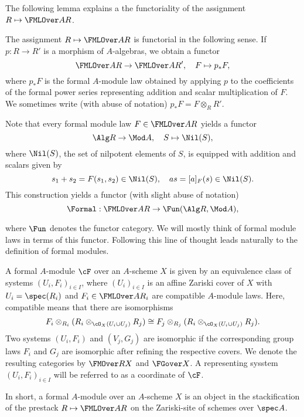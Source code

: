 \documentclass[../main.tex]{subfiles}
\begin{document}
The following lemma explains a the functoriality of the assignment
$R \mapsto \FMLOver A R$.

\begin{lem}\label{lem:FMLFunc}
  The assignment $R \mapsto \FMLOver A R$ is functorial in the following sense.
  If $p: R \to R'$ is a morphism of $A$-algebras, we obtain a functor
  \begin{equation*}
    \FMLOver A R \to \FMLOver A {R'}, \quad F \mapsto p_*F,
  \end{equation*}
  where $p_*F$ is the formal $A$-module law obtained by applying $p$ to the
  coefficients of the formal power series representing addition
  and scalar multiplication of $F$. We sometimes write
  (with abuse of notation) $p_* F = F \otimes_R R'$. 
\end{lem}

Note that every formal module law $F \in \FMLOver A R$ yields a functor
\begin{equation*}
  \Alg R \to \Mod A, \quad S \mapsto \Nil(S),
\end{equation*}
where $\Nil(S)$, the set of nilpotent elements of $S$, is equipped with
addition and scalars given by 
\begin{equation*}
  s_1 + s_2 = F(s_1, s_2) \in \Nil(S), \quad a s = [a]_F(s) \in \Nil(S).
\end{equation*}
This construction yields a functor (with slight abuse of notation)
\begin{equation*}
  \Formal: \FMLOver A R \to \Fun(\Alg R, \Mod A),
\end{equation*}

where $\Fun$ denotes the functor category. We will mostly think of formal 
module laws in terms of this functor. Following this line of thought leads 
naturally to the definition of formal modules. 

\begin{defi}
  A formal $A$-module $\cF$ over an $A$-scheme $X$ is given by an equivalence class
  of systems $(U_i, F_i)_{i \in I}$, where $(U_i)_{i \in I}$ is an affine
  Zariski cover of $X$ with $U_i = \spec(R_i)$ and $F_i \in \FMLOver A {R_i}$
  are compatible $A$-module laws. Here, compatible means that there are
  isomorphisms
  \begin{equation*}
    F_i \otimes_{R_i} (R_i \otimes_{\cO_X(U_i \cup U_j)} R_j)  \cong F_j
    \otimes_{R_j} (R_i \otimes_{\cO_X(U_i \cup U_j)} R_j).
  \end{equation*}
  Two systems $(U_i, F_i)$ and 
  $(V_j, G_j)$ are isomorphic if the corresponding group laws
  $F_i$ and $G_j$ are isomorphic after refining the respective covers. 
  We denote the resulting categories by $\FMOver R X$ and $\FGover X$.
  A representing sysstem $(U_i, F_i)_{i \in I}$ will be referred to as 
  a coordinate of $\cF$.
  
\end{defi}
In short, a formal $A$-module over an $A$-scheme $X$ is an
object in the stackification of the prestack $R \mapsto \FMLOver A R$ on 
the Zariski-site of schemes over $\spec A$. 
\end{document}
